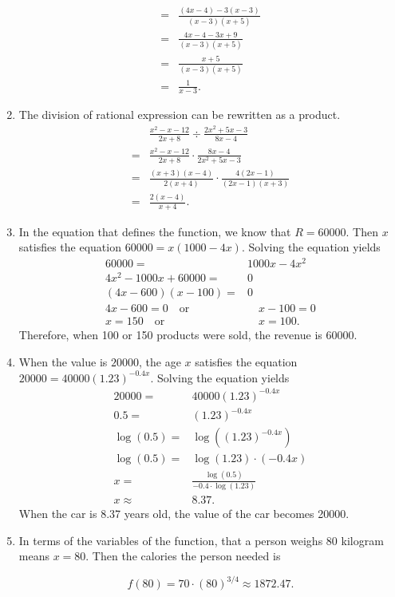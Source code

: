 \documentclass[
  12pt]{article}
\begin{document}
\begin{enumerate}
\[\begin{aligned}
  =&\frac{(4x-4)-3(x-3)}{(x-3)(x+5)}\\
  =&\frac{4x-4-3x+9}{(x-3)(x+5)}\\
  =&\frac{x+5}{(x-3)(x+5)}\\
  =&\frac{1}{x-3}.
  \end{aligned}
  \]
\item
  The division of rational expression can be rewritten as a product. \[
  \begin{aligned}
  &\frac{x^2-x-12}{2x+8}\div\frac{2x^2+5x-3}{8x-4}\\
  =&\frac{x^2-x-12}{2x+8}\cdot\frac{8x-4}{2x^2+5x-3}\\
  =&\frac{(x+3)(x-4)}{2(x+4)}\cdot\frac{4(2x-1)}{(2x-1)(x+3)}\\
  =&\frac{2(x-4)}{x+4}.
  \end{aligned}
  \]
\item
  In the equation that defines the function, we know that \(R=60000\).
  Then \(x\) satisfies the equation \(60000=x(1000-4x)\). Solving the
  equation yields \[
  \begin{aligned}
  60000=&1000x-4x^2\\
  4x^2-1000x+60000=&0\\
  (4x-600)(x-100)=&0\\
  4x-600=0\quad\text{or}&\quad x-100=0\\
  x=150\quad\text{or}&\quad x=100.
  \end{aligned}
  \] Therefore, when 100 or 150 products were sold, the revenue is
  60000.
\item
  When the value is \(20000\), the age \(x\) satisfies the equation
  \(20000=40000(1.23)^{-0.4x}\). Solving the equation yields \[
  \begin{aligned}
  20000=&40000(1.23)^{-0.4x}\\
  0.5=&(1.23)^{-0.4x}\\
  \log(0.5)=&\log((1.23)^{-0.4x})\\
  \log(0.5)=&\log(1.23)\cdot(-0.4x)\\
  x=&\frac{\log(0.5)}{-0.4\cdot\log(1.23)}\\
  x\approx&8.37.
  \end{aligned}
  \] When the car is 8.37 years old, the value of the car becomes 20000.
\item
  In terms of the variables of the function, that a person weighs 80
  kilogram means \(x=80\). Then the calories the person needed is

  \[f(80)=70\cdot(80)^{3/4}\approx 1872.47.\]


\end{enumerate}
\end{document}
